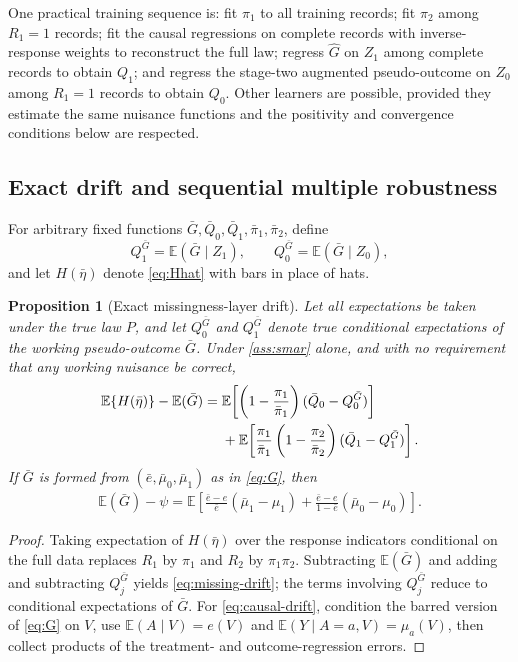 \documentclass[11pt]{article}
\newtheorem{proposition}{Proposition}
\theoremstyle{definition}
\newcommand{\E}{\mathbb{E}}
\newcommand{\1}{\mathbf{1}}
\begin{document}
One practical training sequence is: fit $\pi_1$ to all training records; fit $\pi_2$ among $R_1=1$ records; fit the causal regressions on complete records with inverse-response weights to reconstruct the full law; regress $\widehat G$ on $Z_1$ among complete records to obtain $Q_1$; and regress the stage-two augmented pseudo-outcome on $Z_0$ among $R_1=1$ records to obtain $Q_0$. Other learners are possible, provided they estimate the same nuisance functions and the positivity and convergence conditions below are respected.

\subsection{Exact drift and sequential multiple robustness}

For arbitrary fixed functions $\bar G,\bar Q_0,\bar Q_1,\bar\pi_1,\bar\pi_2$, define
\[
Q_1^{\bar G}=\E(\bar G\mid Z_1),\qquad
Q_0^{\bar G}=\E(\bar G\mid Z_0),
\]
and let $H(\bar\eta)$ denote \cref{eq:Hhat} with bars in place of hats.

\begin{proposition}[Exact missingness-layer drift]\label{prop:drift}
Let all expectations be taken under the true law $P$, and let $Q_0^{\bar G}$ and
$Q_1^{\bar G}$ denote true conditional expectations of the working pseudo-outcome
$\bar G$. Under \cref{ass:smar} alone, and with no requirement that any working
nuisance be correct,
\begin{align}
\E\{H(\bar\eta)\}-\E(\bar G)
={}&\E\!\left[\left(1-\frac{\pi_1}{\bar\pi_1}\right)
(\bar Q_0-Q_0^{\bar G})\right]\notag\\
&+\E\!\left[\frac{\pi_1}{\bar\pi_1}
\left(1-\frac{\pi_2}{\bar\pi_2}\right)
(\bar Q_1-Q_1^{\bar G})\right].
\label{eq:missing-drift}
\end{align}
If $\bar G$ is formed from $(\bar e,\bar\mu_0,\bar\mu_1)$ as in \cref{eq:G}, then
\begin{align}
\E(\bar G)-\psi
=\E\!\left[
\frac{\bar e-e}{\bar e}(\bar\mu_1-\mu_1)
+\frac{\bar e-e}{1-\bar e}(\bar\mu_0-\mu_0)
\right].
\label{eq:causal-drift}
\end{align}
\end{proposition}

\begin{proof}
Taking expectation of $H(\bar\eta)$ over the response indicators conditional on the full data replaces $R_1$ by $\pi_1$ and $R_2$ by $\pi_1\pi_2$. Subtracting $\E(\bar G)$ and adding and subtracting $Q_j^{\bar G}$ yields \cref{eq:missing-drift}; the terms involving $Q_j^{\bar G}$ reduce to conditional expectations of $\bar G$. For \cref{eq:causal-drift}, condition the barred version of \cref{eq:G} on $V$, use $\E(A\mid V)=e(V)$ and $\E(Y\mid A=a,V)=\mu_a(V)$, then collect products of the treatment- and outcome-regression errors.
\end{proof}
\end{document}
